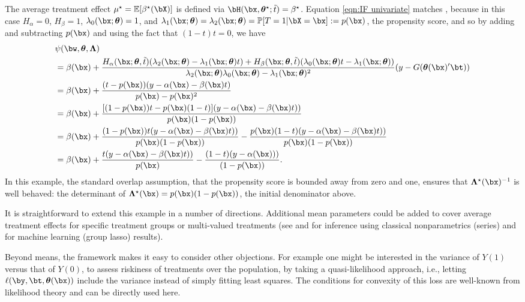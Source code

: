\documentclass[12pt]{article}
\numberwithin{equation}{section}
\theoremstyle{definition}
\newcommand{\E}{\mathbb{E}}
\renewcommand{\P}{\mathbb{P}}
\newcommand{\btheta}{\boldsymbol{\theta}}
\newcommand{\bL}{\boldsymbol{\Lambda}}
\newcommand{\mtrue}{\mu^\star}
\newcommand{\bttrue}{\btheta^\star}
\newcommand{\btrue}{\beta^\star}
\newcommand{\bLtrue}{\bL^\star}
\newcommand{\tstar}{\tilde{t}}
\begin{document}
\begin{appendices}
The average treatment effect $\mtrue = \E[\btrue(\bX)]$ is defined via $\bH(\bx,\bttrue; \tstar) = \btrue$. Equation \eqref{eqn:IF univariate} matches \cite{Hahn1998_Ecma}, because in this case $H_\alpha = 0$, $H_\beta = 1$, $\lambda_0(\bx; \btheta) = 1$, and $\lambda_1(\bx; \btheta) = \lambda_2(\bx; \btheta) = \P[T = 1 \vert \bX = \bx] := p(\bx)$, the propensity score, and so by adding and subtracting $p(\bx)$ and using the fact that $(1-t)t = 0$, we have
\begin{align*}
    & \psi(\bw, \btheta, \bL) \\ 
    & = \beta(\bx) +  \frac{H_\alpha(\bx; \btheta, \tstar) (\lambda_2(\bx; \btheta) - \lambda_1(\bx; \btheta) t ) +    H_\beta(\bx; \btheta, \tstar) (\lambda_0(\bx; \btheta) t - \lambda_1(\bx; \btheta) )}{\lambda_2(\bx; \btheta)\lambda_0(\bx; \btheta) - \lambda_1(\bx; \btheta)^2} (y - G(\btheta(\bx)'\bt ) )       \\
    & = \beta(\bx) +  \frac{ ( t - p(\bx) ) (y - \alpha(\bx) - \beta(\bx) t ) }{p(\bx) - p(\bx)^2}          \\
    & = \beta(\bx) +  \frac{ [ (1-p(\bx))t - p(\bx)(1-t) ] ( y - \alpha(\bx) - \beta(\bx) t)  ) }{p(\bx)(1 - p(\bx))}          \\
    & = \beta(\bx) +  \frac{ (1-p(\bx))t ( y - \alpha(\bx) - \beta(\bx) t)  ) }{p(\bx)(1 - p(\bx))}       -  \frac{  p(\bx)(1-t)  ( y - \alpha(\bx) - \beta(\bx) t)  ) }{p(\bx)(1 - p(\bx))}          \\
    & = \beta(\bx) +  \frac{ t ( y - \alpha(\bx) - \beta(\bx) t)  ) }{p(\bx)}       -  \frac{  (1-t)  ( y - \alpha(\bx) )  ) }{(1 - p(\bx))} .
\end{align*}
In this example, the standard overlap assumption, that the propensity score is bounded away from zero and one, ensures that $\bLtrue(\bx)^{-1}$ is well behaved: the determinant of $\bLtrue(\bx) = p(\bx)(1-p(\bx))$, the initial denominator above.


It is straightforward to extend this example in a number of directions. Additional mean parameters could be added to cover average treatment effects for specific treatment groups or multi-valued treatments (see \cite{Cattaneo2010_JoE} and \cite{Cattaneo-Farrell2011_chapter} for inference using classical nonparametrics (series) and \cite{Farrell2015_arXiv} for machine learning (group lasso) results). 

Beyond means, the framework makes it easy to consider other objections. For example one might be interested in the variance of $Y(1)$ versus that of $Y(0)$, to assess riskiness of treatments over the population, by taking a quasi-likelihood approach, i.e., letting $\ell(\by,\bt,\btheta(\bx))$ include the variance instead of simply fitting least squares. The conditions for convexity of this loss are well-known from likelihood theory and can be directly used here.







\end{appendices}
\end{document}
